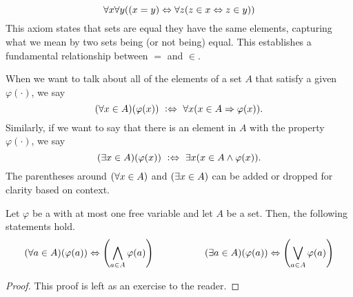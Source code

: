 \begin{axiom}[Extensionality]\label{ax:extensionality}
    \vspace{-\abovedisplayskip}
    \[
        \forall x \forall y \pn*{\pn*{x = y} \iff \forall z \pn*{z \in x \iff z \in y}}
    \]
    This axiom states that sets are equal \ifandonlyif they have the same elements,
    capturing what we mean by two sets being (or not being) equal.
    This establishes a fundamental relationship between \(=\) and \(\in\).
\end{axiom}

\begin{definition}
    When we want to talk about all of the elements of a set \(A\) that satisfy a given {\wff} \(\varphi(\cdot)\),
    we say
    \[
        \pn*{\forall x \in A}\pn*{\varphi(x)} \iffdefn \forall x \pn*{x \in A \implies \varphi(x)}.
    \]
    Similarly, if we want to say that there is an element in \(A\) with the property \(\varphi(\cdot)\),
    we say
    \[
        \pn*{\exists x \in A}\pn*{\varphi(x)} \iffdefn \exists x \pn*{x \in A \meet \varphi(x)}.
    \]
    The parentheses around \(\pn*{\forall x \in A}\) and \(\pn*{\exists x \in A}\)
    can be added or dropped for clarity based on context.
\end{definition}

\begin{theorem}
    Let \(\varphi\) be a {\wff} with at most one free variable and let \(A\) be a set.
    Then, the following statements hold.
    \[
        \pn*{\forall a \in A}\pn*{\varphi(a)} \iff \pn*{\bigmeet_{a \in A}\varphi(a)}
        ~~~~~~~~~~~~~~~~
        \pn*{\exists a \in A}\pn*{\varphi(a)} \iff \pn*{\bigjoin_{a \in A}\varphi(a)}
    \]
\end{theorem}
\begin{proof}
    This proof is left as an exercise to the reader.
\end{proof}
% 

